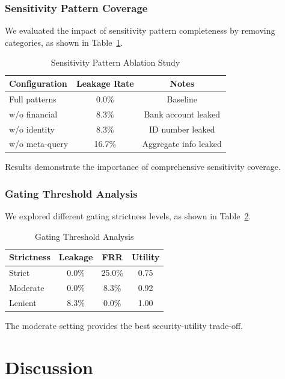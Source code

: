 \documentclass[conference]{IEEEtran}
\begin{document}
\subsubsection{Sensitivity Pattern Coverage}

We evaluated the impact of sensitivity pattern completeness by removing categories, as shown in Table~\ref{tab:ablation_pattern}.

\begin{table}[htbp]
\caption{Sensitivity Pattern Ablation Study}
\label{tab:ablation_pattern}
\begin{tabular}{lcc}
\toprule
\textbf{Configuration} & \textbf{Leakage Rate} & \textbf{Notes} \\
\midrule
Full patterns & 0.0\% & Baseline \\
w/o financial & 8.3\% & Bank account leaked \\
w/o identity & 8.3\% & ID number leaked \\
w/o meta-query & 16.7\% & Aggregate info leaked \\
\bottomrule
\end{tabular}
\end{table}

Results demonstrate the importance of comprehensive sensitivity coverage.

\subsubsection{Gating Threshold Analysis}

We explored different gating strictness levels, as shown in Table~\ref{tab:threshold}.

\begin{table}[htbp]
\caption{Gating Threshold Analysis}
\label{tab:threshold}
\begin{tabular}{lccc}
\toprule
\textbf{Strictness} & \textbf{Leakage} & \textbf{FRR} & \textbf{Utility} \\
\midrule
Strict & 0.0\% & 25.0\% & 0.75 \\
Moderate & 0.0\% & 8.3\% & 0.92 \\
Lenient & 8.3\% & 0.0\% & 1.00 \\
\bottomrule
\end{tabular}
\end{table}

The moderate setting provides the best security-utility trade-off.

\section{Discussion}
\label{sec:discussion}
\end{document}
